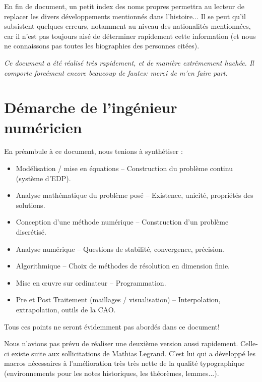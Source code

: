 \documentclass[11pt,pdflatex]{book}
\begin{document}
\medskip
En fin de document, un petit index des noms propres permettra au lecteur
de replacer les divers développements mentionnés dans l'histoire...
Il se peut qu'il subsistent quelques erreurs, notamment au niveau des
nationalités mentionnées, car il n'est pas toujours aisé de déterminer rapidement cette 
information (et nous ne connaissons pas toutes les biographies des personnes citées).

\medskip
\emph{Ce document a été réalisé très rapidement, et de manière extrêmement hachée.
Il comporte forcément encore beaucoup de fautes: merci de m'en faire part.}




\bigskip
\section*{Démarche de l'ingénieur numéricien}

En préambule à ce document, nous tenions à synthétiser :
\begin{itemize}
  \item Modélisation / mise en équations -- Construction du problème continu (système d'EDP).
  \item Analyse mathématique du problème posé -- Existence, unicité, propriétés des solutions.
  \item Conception d'une méthode numérique -- Construction d'un problème discrétisé.
  \item Analyse numérique -- Questions de stabilité, convergence, précision.
  \item Algorithmique -- Choix de méthodes de résolution en dimension finie.
  \item Mise en œuvre sur ordinateur -- Programmation.
  \item Pre et Post Traitement (maillages / visualisation) -- Interpolation, extrapolation, outils de la CAO.
\end{itemize}

\medskip
Tous ces points ne seront évidemment pas abordés dans ce document!
\vfill
\noindent
{}

Nous n'avions pas prévu de réaliser une deuxième version aussi rapidement.
Celle-ci existe suite aux sollicitations de Mathias Legrand.
C'est lui qui a développé les macros nécessaires à l'amélioration très très nette de la 
qualité typographique (environnements pour les notes historiques, les théorèmes, lemmes...).
\end{document}

